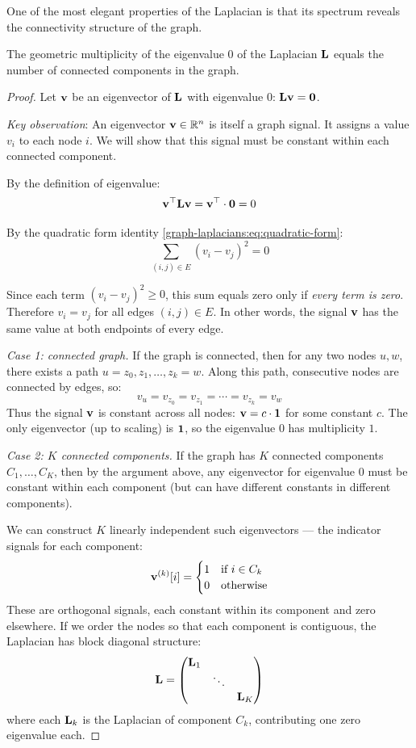 \begin{notechapter}
One of the most elegant properties of the Laplacian is that its spectrum reveals the connectivity structure of the graph.

\begin{theorem}\label{graph-laplacians:thm:zero-eigenvalue}
The geometric multiplicity of the eigenvalue $0$ of the Laplacian $\mathbf{L}$ equals the number of connected components in the graph.
\end{theorem}

\begin{proof}
Let $\mathbf{v}$ be an eigenvector of $\mathbf{L}$ with eigenvalue $0$: $\mathbf{L} \mathbf{v} = \mathbf{0}$.

\emph{Key observation}: An eigenvector $\mathbf{v} \in \mathbb{R}^n$ is itself a graph signal. It assigns a value $v_i$ to each node $i$. We will show that this signal must be constant within each connected component.

By the definition of eigenvalue:
\[
\mathbf{v}^\top \mathbf{L} \mathbf{v} = \mathbf{v}^\top \cdot \mathbf{0} = 0
\]

By the quadratic form identity \eqref{graph-laplacians:eq:quadratic-form}:
\[
\sum_{(i,j) \in E} (v_i - v_j)^2 = 0
\]

Since each term $(v_i - v_j)^2 \geq 0$, this sum equals zero only if \emph{every term is zero}. Therefore $v_i = v_j$ for all edges $(i,j) \in E$. In other words, the signal $\mathbf{v}$ has the same value at both endpoints of every edge.

\emph{Case 1: connected graph.} If the graph is connected, then for any two nodes $u, w$, there exists a path $u = z_0, z_1, \ldots, z_k = w$. Along this path, consecutive nodes are connected by edges, so:
\[
v_u = v_{z_0} = v_{z_1} = \cdots = v_{z_k} = v_w
\]
Thus the signal $\mathbf{v}$ is constant across all nodes: $\mathbf{v} = c \cdot \mathbf{1}$ for some constant $c$. The only eigenvector (up to scaling) is $\mathbf{1}$, so the eigenvalue $0$ has multiplicity $1$.

\emph{Case 2: $K$ connected components.} If the graph has $K$ connected components $C_1, \ldots, C_K$, then by the argument above, any eigenvector for eigenvalue $0$ must be constant within each component (but can have different constants in different components).

We can construct $K$ linearly independent such eigenvectors --- the indicator signals for each component:
\[
\mathbf{v}^{(k)}[i] = \begin{cases} 1 & \text{if } i \in C_k \\ 0 & \text{otherwise} \end{cases}
\]
These are orthogonal signals, each constant within its component and zero elsewhere. If we order the nodes so that each component is contiguous, the Laplacian has block diagonal structure:
\[
\mathbf{L} = \begin{pmatrix} \mathbf{L}_1 & & \\ & \ddots & \\ & & \mathbf{L}_K \end{pmatrix}
\]
where each $\mathbf{L}_k$ is the Laplacian of component $C_k$, contributing one zero eigenvalue each.
\end{proof}


\end{notechapter}
